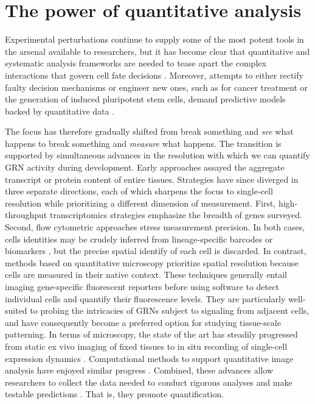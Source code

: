 \section{The power of quantitative analysis}

Experimental perturbations continue to supply some of the most potent tools in the arsenal available to researchers, but it has become clear that quantitative and systematic analysis frameworks are needed to tease apart the complex interactions that govern cell fate decisions \cite{Lazebnik2004,Oates2009}. Moreover, attempts to either rectify faulty decision mechanisms or engineer new ones, such as for cancer treatment or the generation of induced pluripotent stem cells, demand predictive models backed by quantitative data \cite{Hornberg2006}.

The focus has therefore gradually shifted from break something and \textit{see} what happens to break something and \textit{measure} what happens. The transition is supported by simultaneous advances in the resolution with which we can quantify GRN activity during development. Early approaches assayed the aggregate transcript or protein content of entire tissues. Strategies have since diverged in three separate directions, each of which sharpens the focus to single-cell resolution while prioritizing a different dimension of measurement. First, high-throughput transcriptomics strategies emphasize the breadth of genes surveyed. Second, flow cytometric approaches stress measurement precision. In both cases, cells identities may be crudely inferred from lineage-specific barcodes or biomarkers \cite{Herring2018}, but the precise spatial identify of each cell is discarded. In contrast, methods based on quantitative microscopy prioritize spatial resolution because cells are measured in their native context. These techniques generally entail imaging gene-specific fluorescent reporters before using software to detect individual cells and quantify their fluorescence levels. They are particularly well-suited to probing the intricacies of GRNs subject to signaling from adjacent cells, and have consequently become a preferred option for studying tissue-scale patterning. In terms of microscopy, the state of the art has steadily progressed from static ex vivo imaging of fixed tissues to in situ recording of single-cell expression dynamics \cite{Keller2013}. Computational methods to support quantitative image analysis have enjoyed similar progress \cite{Sbalzarini2016}. Combined, these advances allow researchers to collect the data needed to conduct rigorous analyses and make testable predictions \cite{qbio2018}. That is, they promote quantification.

